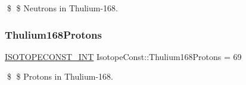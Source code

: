 \$ \$ Neutrons in Thulium-\/168. \mbox{\label{group___isotope_const-_thulium-_tm168_ga890eaf12ff9b19cf6ff48aa18eb23816}} 
\subsubsection{\texorpdfstring{Thulium168\+Protons}{Thulium168Protons}}
{\footnotesize\ttfamily \mbox{\hyperlink{group___isotope_const-_macros_ga5f18360b3e99483a35c32d789e62621c}{I\+S\+O\+T\+O\+P\+E\+C\+O\+N\+S\+T\+\_\+\+I\+NT}} Isotope\+Const\+::\+Thulium168\+Protons = 69}

\$ \$ Protons in Thulium-\/168. 